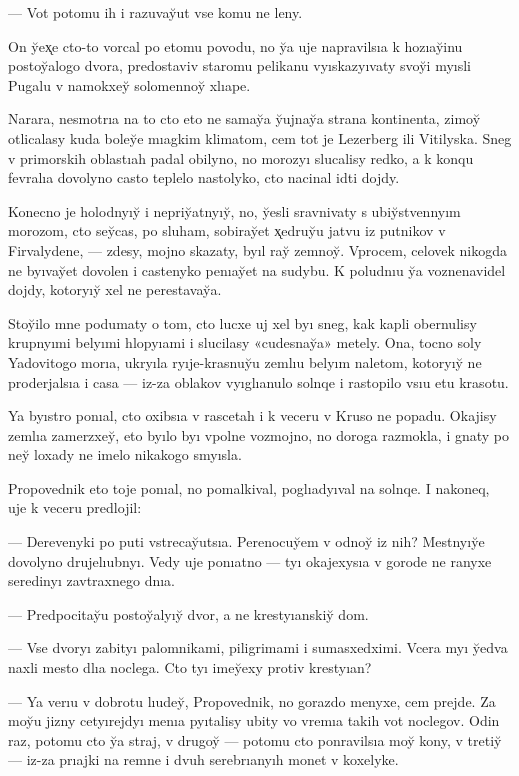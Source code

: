 \documentclass[10pt]{book}
\begin{document}
— Vot potomu ih i razuvay̆ut vse komu ne leny.

On y̆ex̨e cto-to vorcal po etomu povodu, no y̆a uje napravilsıa k hozıay̆inu postoy̆alogo dvora, predostaviv staromu pelikanu vyıskazyıvaty svoy̆i myısli Pugalu v namokxey̆ solomennoy̆ xlıape.



Narara, nesmotrıa na to cto eto ne samay̆a y̆ujnay̆a strana kontinenta, zimoy̆ otlicalasy kuda boley̆e mıagkim klimatom, cem tot je Lezerberg ili Vitilyska. Sneg v primorskih oblastıah padal obilyno, no morozyı slucalisy redko, a k konqu fevralıa dovolyno casto teplelo nastolyko, cto nacinal idti dojdy.

Konecno je holodnyıy̆ i nepriy̆atnyıy̆, no, y̆esli sravnivaty s ubiy̆stvennyım morozom, cto sey̆cas, po sluham, sobiray̆et x̨edruy̆u jatvu iz putnikov v Firvalydene, — zdesy, mojno skazaty, byıl ray̆ zemnoy̆. Vprocem, celovek nikogda ne byıvay̆et dovolen i castenyko penıay̆et na sudybu. K poludnıu y̆a voznenavidel dojdy, kotoryıy̆ xel ne perestavay̆a.

Stoy̆ilo mne podumaty o tom, cto lucxe uj xel byı sneg, kak kapli obernulisy krupnyımi belyımi hlopyıami i slucilasy «cudesnay̆a» metely. Ona, tocno soly Yadovitogo morıa, ukryıla ryıje-krasnuy̆u zemlıu belyım naletom, kotoryıy̆ ne proderjalsıa i casa — iz-za oblakov vyıglıanulo solnqe i rastopilo vsıu etu krasotu.

Ya byıstro ponıal, cto oxibsıa v rascetah i k veceru v Kruso ne popadu. Okajisy zemlıa zamerzxey̆, eto byılo byı vpolne vozmojno, no doroga razmokla, i gnaty po ney̆ loxady ne imelo nikakogo smyısla.

Propovednik eto toje ponıal, no pomalkival, poglıadyıval na solnqe. I nakoneq, uje k veceru predlojil:

— Derevenyki po puti vstrecay̆utsıa. Perenocuy̆em v odnoy̆ iz nih? Mestnyıy̆e dovolyno drujelıubnyı. Vedy uje ponıatno — tyı okajexysıa v gorode ne ranyxe seredinyı zavtraxnego dnıa.

— Predpocitay̆u postoy̆alyıy̆ dvor, a ne krestyıanskiy̆ dom.

— Vse dvoryı zabityı palomnikami, piligrimami i sumasxedximi. Vcera myı y̆edva naxli mesto dlıa noclega. Cto tyı imey̆exy protiv krestyıan?

— Ya verıu v dobrotu lıudey̆, Propovednik, no gorazdo menyxe, cem prejde. Za moy̆u jizny cetyırejdyı menıa pyıtalisy ubity vo vremıa takih vot noclegov. Odin raz, potomu cto y̆a straj, v drugoy̆ — potomu cto ponravilsıa moy̆ kony, v tretiy̆ — iz-za prıajki na remne i dvuh serebrıanyıh monet v koxelyke.
\end{document}
